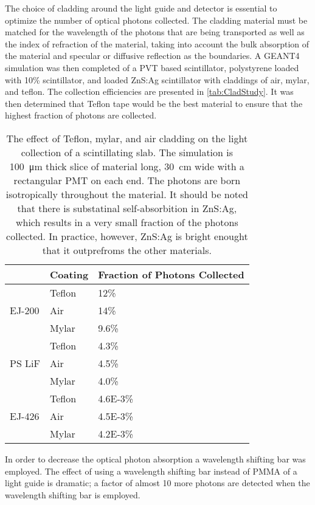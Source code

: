 The choice of cladding around the light guide and detector is essential to optimize the number of optical photons collected.
The cladding material must be matched for the wavelength of the photons that are being transported as well as the index of refraction of the material, taking into account the bulk absorption of the material and specular or diffusive reflection as the boundaries.
A GEANT4 simulation was then completed of a PVT based scintillator, polystyrene loaded with 10\%  scintillator, and  loaded ZnS:Ag scintillator with claddings of air, mylar, and teflon.
The collection efficiencies are presented in \autoref{tab:CladStudy}.
It was then determined that Teflon tape would be the best material to ensure that the highest fraction of photons are collected.
\begin{table}
  \caption[Teflon, Mylar, and HDPE Cladding Light Collection Effect]{The effect of Teflon, mylar, and air cladding on the light collection of a scintillating slab. The simulation is \SI{100}{\um} thick slice of material  long, \SI{30}{\cm} wide with a rectangular PMT on each end. The photons are born isotropically throughout the material. It should be noted that there is substatinal self-absorbition in ZnS:Ag, which results in a very small fraction of the photons collected. In practice, however, ZnS:Ag is bright enought that it outprefroms the other materials.}
  \label{tab:CladStudy}
  \begin{tabular}{p{4cm} m{3cm} m{3cm}}
  \toprule
  & Coating & Fraction of Photons Collected \\
  \midrule 
  \multirow{3}{*}{EJ-200} & Teflon & 12\% \\
  				      & Air &  14\% \\
				      & Mylar & 9.6\% \\
  \midrule 
  \multirow{3}{*}{PS LiF} & Teflon & 4.3\% \\
  				      & Air & 4.5\% \\
				      & Mylar & 4.0\% \\
  \midrule 
  \multirow{3}{*}{EJ-426} & Teflon & \num{4.6E-3}\% \\
  				      & Air & \num{4.5E-3}\% \\
				      & Mylar & \num{4.2E-3}\% \\
 \bottomrule				 	   				  
 \end{tabular}
\end{table}
In order to decrease the optical photon absorption a wavelength shifting bar was employed.
The effect of using a wavelength shifting bar instead of PMMA of a light guide is dramatic; a factor of almost 10 more photons are detected when the wavelength shifting bar is employed.
